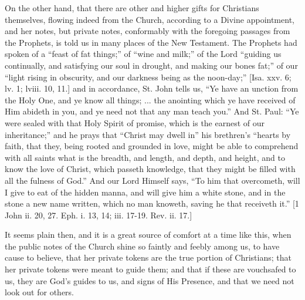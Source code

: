 On the other hand, that there are other and higher gifts for
Christians themselves, flowing indeed from the Church, according to a
Divine appointment, and her notes, but private notes, conformably with
the foregoing passages from the Prophets, is told us in many places of
the New Testament. The Prophets had spoken of a ``feast of fat
things;'' of ``wine and milk;'' of the Lord ``guiding
us continually, and satisfying our soul in drought, and making our
bones fat;'' of our ``light rising in obscurity, and our
darkness being as the noon-day;'' [Isa. xxv. 6; lv. 1; lviii. 10,
11.] and in accordance, St. John tells us, ``Ye have an unction
from the Holy One, and ye know all things; ... the anointing which ye
have received of Him abideth in you, and ye need not that any man
teach you.'' And St. Paul: ``Ye were sealed with that Holy
Spirit of promise, which is the earnest of our inheritance;'' and
he prays that ``Christ may dwell in'' his brethren's
``hearts by faith, that they, being rooted and grounded in love,
might be able to comprehend with all saints what is the breadth, and
length, and depth, and height, and to know the love of Christ, which
passeth knowledge, that they might be filled with all the fulness of
God.'' And our Lord Himself says, ``To him that overcometh,
will I give to eat of the hidden manna, and will give him a white
stone, and in the stone a new name written, which no man knoweth,
saving he that receiveth it.'' [1 John ii. 20, 27. Eph. i. 13, 14;
iii. 17-19. Rev. ii. 17.]

It seems plain then, and it is a great source of comfort at a time
like this, when the public notes of the Church shine so faintly and
feebly among us, to have cause to believe, that her private tokens are
the true portion of Christians; that her private tokens were meant to
guide them; and that if these are vouchsafed to us, they are God's
guides to us, and signs of His Presence, and that we need not look out
for others.

